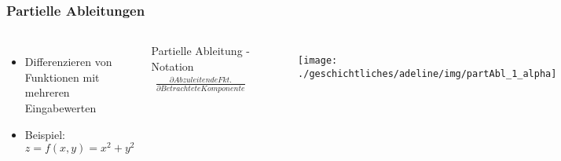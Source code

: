 \begin{frame}
\frametitle{Partielle Ableitungen}

\begin{columns}

\begin{itemize}
\item Differenzieren von Funktionen mit mehreren Eingabewerten
\item Beispiel: $z = f(x, y) = x^2 + y^2$
\end{itemize}

\hspace{2mm}

\begin{block}{Partielle Ableitung - Notation}
\begin{align*}
\frac{\partial Abzuleitende Fkt.}{\partial Betrachtete Komponente}
\end{align*}
\end{block}

\begin{figure}
\texttt{[image: ./geschichtliches/adeline/img/partAbl\_1\_alpha]}
\end{figure}

\end{columns}




\end{frame}


